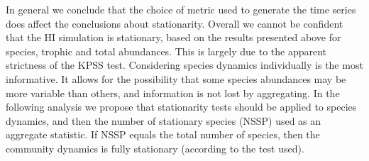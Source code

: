 In general we conclude that the choice of metric used to generate the time series does affect the conclusions about stationarity. Overall we cannot be confident that the HI simulation is stationary, based on the results presented above for species, trophic and total abundances. This is largely due to the apparent strictness of the KPSS test. Considering species dynamics individually is the most informative. It allows for the possibility that some species abundances may be more variable than others, and information is not lost by aggregating.  In the following analysis we propose that stationarity tests should be applied to species dynamics, and then the number of stationary species (NSSP) used as an aggregate statistic. If NSSP equals the total number of species, then the community dynamics is fully stationary (according to the test used).   


